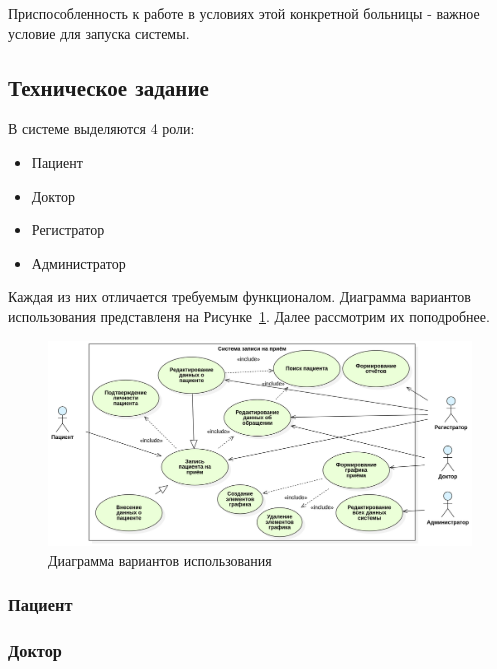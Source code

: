 \documentclass[a4paper,article]{article}
\begin{document}
        Приспособленность к работе в условиях этой конкретной больницы - важное условие для запуска системы.

    \subsection{Техническое задание}

        В системе выделяются 4 роли:

        \begin{itemize}[nolistsep]
            \item Пациент
            \item Доктор
            \item Регистратор
            \item Администратор
        \end{itemize}

        Каждая из них отличается требуемым функционалом. Диаграмма вариантов использования представленя на Рисунке~\ref{fig:Диаграмма вариантов использования}. Далее рассмотрим их поподробнее.

        \begin{figure}[h]

            \centering

            \includegraphics[width=0.8\linewidth]{Диаграмма вариантов использования.png}

            \caption{\centering Диаграмма вариантов использования}

            \label{fig:Диаграмма вариантов использования}

        \end{figure}

    \subsubsection{Пациент}

    \subsubsection{Доктор}
\end{document}
